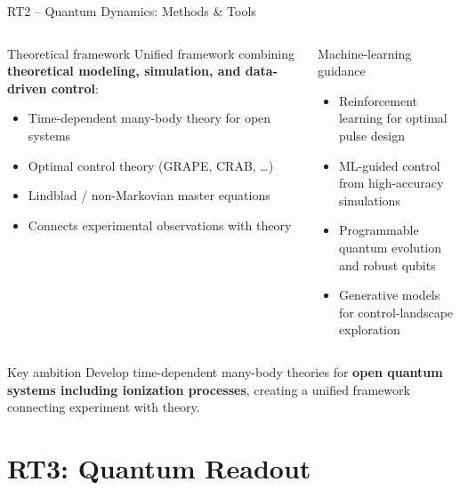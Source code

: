 \documentclass[aspectratio=169,10pt]{beamer}
\begin{document}
\begin{frame}{RT2 -- Quantum Dynamics: Methods \& Tools}
  \begin{columns}[T]
      \begin{block}{Theoretical framework}
        Unified framework combining \textbf{theoretical modeling,
        simulation, and data-driven control}:
        \begin{itemize}
          \item Time-dependent many-body theory for open systems
          \item Optimal control theory (GRAPE, CRAB, \ldots)
          \item Lindblad / non-Markovian master equations
          \item Connects experimental observations with theory
        \end{itemize}
      \end{block}
      \begin{block}{Machine-learning guidance}
        \begin{itemize}
          \item Reinforcement learning for optimal pulse design
          \item ML-guided control from high-accuracy simulations
          \item Programmable quantum evolution and robust qubits
          \item Generative models for control-landscape exploration
        \end{itemize}
      \end{block}
  \end{columns}
  \vspace{4pt}
  \begin{alertblock}{Key ambition}
    Develop time-dependent many-body theories for
    \textbf{open quantum systems including ionization processes},
    creating a unified framework connecting experiment with theory.
  \end{alertblock}
\end{frame}

\section{RT3: Quantum Readout}
\end{document}

